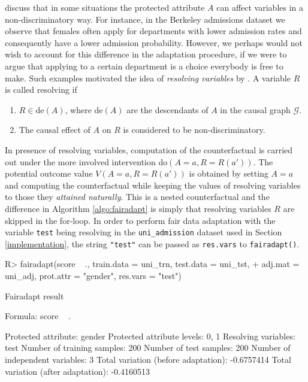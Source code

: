 \documentclass[
  nojss]{jss}
\providecommand{\tightlist}{%
  \setlength{\itemsep}{0pt}\setlength{\parskip}{0pt}}
\begin{document}
\cite{kilbertus2017avoiding} discuss that in some situations the
protected attribute \(A\) can affect variables in a non-discriminatory
way. For instance, in the Berkeley admissions dataset
\citep{bickel1975sex} we observe that females often apply for
departments with lower admission rates and consequently have a lower
admission probability. However, we perhaps would not wish to account for
this difference in the adaptation procedure, if we were to argue that
applying to a certain department is a choice everybody is free to make.
Such examples motivated the idea of \emph{resolving variables} by
\citet{kilbertus2017avoiding}. A variable \(R\) is called resolving if

\begin{enumerate}
\def\labelenumi{(\roman{enumi})}
\tightlist
\item
  \(R \in \mathrm{de}(A)\), where \(\mathrm{de}(A)\) are the descendants
  of \(A\) in the causal graph \(\mathcal{G}\).
\item
  The causal effect of \(A\) on \(R\) is considered to be
  non-discriminatory.
\end{enumerate}

In presence of resolving variables, computation of the counterfactual is
carried out under the more involved intervention
do\((A = a, R = R(a'))\). The potential outcome value
\(V(A = a, R = R(a'))\) is obtained by setting \(A = a\) and computing
the counterfactual while keeping the values of resolving variables to
those they \emph{attained naturally}. This is a nested counterfactual
and the difference in Algorithm \ref{algo:fairadapt} is simply that
resolving variables \(R\) are skipped in the for-loop. In order to
perform fair data adaptation with the variable \texttt{test} being
resolving in the \texttt{uni\_admission} dataset used in Section
\ref{implementation}, the string \texttt{"test"} can be passed as
\texttt{res.vars} to \texttt{fairadapt()}.

\begin{CodeChunk}
\begin{CodeInput}
R> fairadapt(score ~ ., train.data = uni_trn, test.data = uni_tst,
+           adj.mat = uni_adj, prot.attr = "gender", res.vars = "test")
\end{CodeInput}
\begin{CodeOutput}
Fairadapt result

Formula:
 score ~ . 

Protected attribute:                  gender 
Protected attribute levels:           0, 1 
Resolving variables:                  test 
Number of training samples:           200 
Number of test samples:               200 
Number of independent variables:      3 
Total variation (before adaptation):  -0.6757414 
Total variation (after adaptation):   -0.4160513 
\end{CodeOutput}
\end{CodeChunk}
\end{document}
